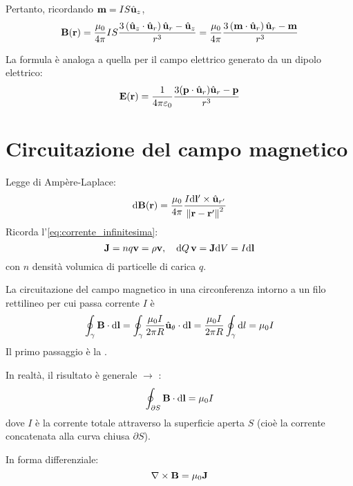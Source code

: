 Pertanto, ricordando $\mathbf{m} = I S \hat{\mathbf{u}}_{z}$,
\begin{equation}
    \mathbf{B}(\mathbf{r}) = \frac{\mu_0}{4\pi} I S \frac{3 \left( \hat{\mathbf{u}}_{z} \cdot \hat{\mathbf{u}}_{r} \right) \hat{\mathbf{u}}_{r} - \hat{\mathbf{u}}_{z}}{r^3}
    = \frac{\mu_0}{4\pi} \frac{3 \left( \mathbf{m} \cdot \hat{\mathbf{u}}_{r} \right) \hat{\mathbf{u}}_{r} - \mathbf{m}}{r^3}
\end{equation}

La formula è analoga a quella per il campo elettrico generato da un dipolo elettrico:
\begin{equation}
    \mathbf{E}(\mathbf{r}) = \frac{1}{4\pi\varepsilon_0} \frac{3 (\mathbf{p} \cdot \hat{\mathbf{u}}_{r}) \hat{\mathbf{u}}_{r} - \mathbf{p}}{r^3}
\end{equation}



\section{Circuitazione del campo magnetico}

Legge di Ampère-Laplace:
\begin{equation}
    \mathrm{d} \mathbf{B}(\mathbf{r}) = \frac{\mu_0}{4\pi} \frac{I \mathrm{d} \mathbf{l}' \times \hat{\mathbf{u}}_{r'}}{\left\lVert \mathbf{r} - \mathbf{r}' \right\rVert^2}
\end{equation}
Ricorda l'\cref{eq:corrente_infinitesima}:
\begin{equation}
    \mathbf{J} = n q \mathbf{v} = \rho \mathbf{v}, \quad \mathrm{d} Q \, \mathbf{v} = \mathbf{J} \mathrm{d} V = I \mathrm{d}\mathbf{l}
\end{equation}
con $n$ densità volumica di particelle di carica $q$.

La circuitazione del campo magnetico in una circonferenza intorno a un filo rettilineo per cui passa corrente $I$ è
\begin{equation}
    \oint_\gamma \mathbf{B} \cdot \mathrm{d} \mathbf{l} = \oint_\gamma \frac{\mu_0 I}{2\pi R} \hat{\mathbf{u}}_{\theta} \cdot \mathrm{d} \mathbf{l} = \frac{\mu_0 I}{2\pi R} \oint_\gamma \mathrm{d} l = \mu_0 I
\end{equation}
Il primo passaggio è la .

In realtà, il risultato è generale $\to$ :
\begin{equation}
    \oint_{\partial S} \mathbf{B} \cdot \mathrm{d} \mathbf{l} = \mu_0 I
\end{equation}
dove $I$ è la corrente totale attraverso la superficie aperta $S$ (cioè la corrente concatenata alla curva chiusa $\partial S$).

In forma differenziale:
\begin{equation}
    \nabla \times \mathbf{B} = \mu_0 \mathbf{J}
\end{equation}

